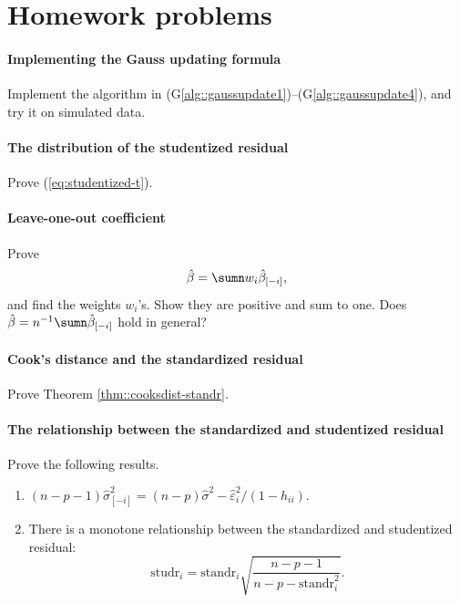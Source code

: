 \section{Homework problems}





\paragraph{Implementing the Gauss updating formula}
Implement the algorithm in (G\ref{alg::gaussupdate1})--(G\ref{alg::gaussupdate4}), and try it on simulated data. 


\paragraph{The distribution of the studentized residual}

Prove (\ref{eq:studentized-t}).

\paragraph{Leave-one-out coefficient}\label{hw10::loo-coefficient}

Prove 
\[
\hat{\beta}=\sumn w_{i}\hat{\beta}_{[-i]},
\]
and find the weights $w_{i}$'s. Show they are positive and sum to
one. Does $\hat{\beta}=n^{-1}\sumn\hat{\beta}_{[-i]}$ hold in general?

\paragraph{Cook's distance and the standardized residual}\label{hw10::cooks-standr}

Prove Theorem \ref{thm::cooksdist-standr}. 


\paragraph{The relationship between the standardized and studentized residual}\label{hw10::residuals-relationship}

Prove the following results. 
\begin{enumerate}
\item $(n-p-1)\hat{\sigma}_{[-i]}^{2}=(n-p)\hat{\sigma}^{2}-\hat{\varepsilon}_{i}^{2}/(1-h_{ii})$. 

 


\item There is a monotone relationship between the standardized and studentized
residual:
\[
\text{studr}_{i}=\text{standr}_{i}\sqrt{\frac{n-p-1}{n-p-\text{standr}_{i}^{2}}}.
\]
\end{enumerate}

